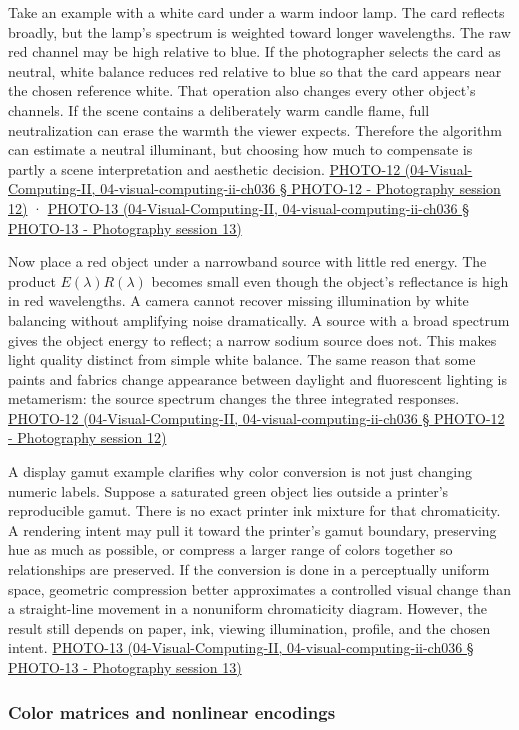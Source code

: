 Take an example with a white card under a warm indoor lamp. The card reflects broadly, but the lamp's spectrum is weighted toward longer wavelengths. The raw red channel may be high relative to blue. If the photographer selects the card as neutral, white balance reduces red relative to blue so that the card appears near the chosen reference white. That operation also changes every other object's channels. If the scene contains a deliberately warm candle flame, full neutralization can erase the warmth the viewer expects. Therefore the algorithm can estimate a neutral illuminant, but choosing how much to compensate is partly a scene interpretation and aesthetic decision. \href{}{PHOTO-12 (04-Visual-Computing-II, 04-visual-computing-ii-ch036 § PHOTO-12 - Photography session 12)} · \href{}{PHOTO-13 (04-Visual-Computing-II, 04-visual-computing-ii-ch036 § PHOTO-13 - Photography session 13)}

Now place a red object under a narrowband source with little red energy. The product \(E(\lambda)R(\lambda)\) becomes small even though the object's reflectance is high in red wavelengths. A camera cannot recover missing illumination by white balancing without amplifying noise dramatically. A source with a broad spectrum gives the object energy to reflect; a narrow sodium source does not. This makes light quality distinct from simple white balance. The same reason that some paints and fabrics change appearance between daylight and fluorescent lighting is metamerism: the source spectrum changes the three integrated responses. \href{}{PHOTO-12 (04-Visual-Computing-II, 04-visual-computing-ii-ch036 § PHOTO-12 - Photography session 12)}

A display gamut example clarifies why color conversion is not just changing numeric labels. Suppose a saturated green object lies outside a printer's reproducible gamut. There is no exact printer ink mixture for that chromaticity. A rendering intent may pull it toward the printer's gamut boundary, preserving hue as much as possible, or compress a larger range of colors together so relationships are preserved. If the conversion is done in a perceptually uniform space, geometric compression better approximates a controlled visual change than a straight-line movement in a nonuniform chromaticity diagram. However, the result still depends on paper, ink, viewing illumination, profile, and the chosen intent. \href{}{PHOTO-13 (04-Visual-Computing-II, 04-visual-computing-ii-ch036 § PHOTO-13 - Photography session 13)}

\subsubsection{Color matrices and nonlinear encodings}\label{color-matrices-and-nonlinear-encodings}

